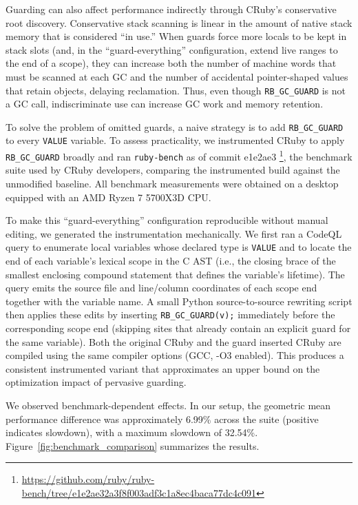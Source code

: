 Guarding can also affect performance indirectly through CRuby's conservative root discovery.  Conservative stack scanning is linear in the amount of native stack memory that is considered ``in use.''  When guards force more locals to be kept in stack slots (and, in the ``guard-everything'' configuration, extend live ranges to the end of a scope), they can increase both the number of machine words that must be scanned at each GC and the number of accidental pointer-shaped values that retain objects, delaying reclamation.  Thus, even though \texttt{RB\_GC\_GUARD} is not a GC call, indiscriminate use can increase GC work and memory retention.

To solve the problem of omitted guards, a naive strategy is to add \texttt{RB\_GC\_GUARD} to every \texttt{VALUE} variable. To assess practicality, we instrumented CRuby to apply \texttt{RB\_GC\_GUARD} broadly and ran \texttt{ruby-bench} as of commit e1e2ae3 \footnote{\url{https://github.com/ruby/ruby-bench/tree/e1e2ae32a3f8f003adf3c1a8ec4baca77dc4c091}}, the benchmark suite used by CRuby developers, comparing the instrumented build against the unmodified baseline. All benchmark measurements were obtained on a desktop equipped with an AMD Ryzen 7 5700X3D CPU.

To make this ``guard-everything'' configuration reproducible without manual editing, we generated the instrumentation mechanically. We first ran a CodeQL query to enumerate local variables whose declared type is \texttt{VALUE} and to locate the end of each variable's lexical scope in the C AST (i.e., the closing brace of the smallest enclosing compound statement that defines the variable's lifetime). The query emits the source file and line/column coordinates of each scope end together with the variable name. A small Python source-to-source rewriting script then applies these edits by inserting \texttt{RB\_GC\_GUARD(v);} immediately before the corresponding scope end (skipping sites that already contain an explicit guard for the same variable). Both the original CRuby and the guard inserted CRuby are compiled using the same compiler options (GCC, -O3 enabled). This produces a consistent instrumented variant that approximates an upper bound on the optimization impact of pervasive guarding.

We observed benchmark-dependent effects. In our setup, the geometric mean performance difference was approximately 6.99\% across the suite (positive indicates slowdown), with a maximum slowdown of 32.54\%. Figure~\ref{fig:benchmark_comparison} summarizes the results.

